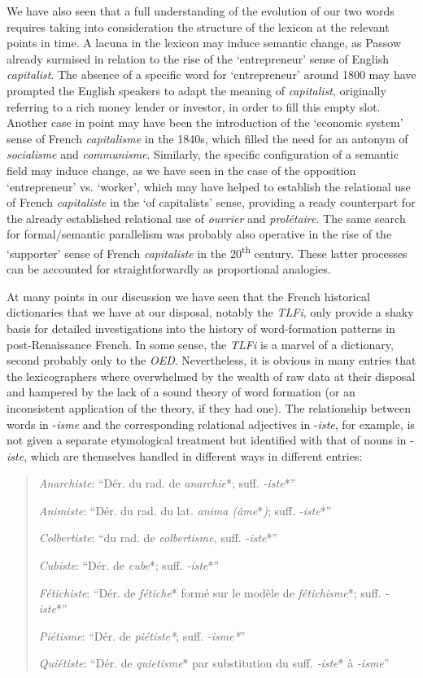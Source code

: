 \documentclass[output=paper]{langsci/langscibook}
\begin{document}
We have also seen that a full understanding of the evolution of our two
words requires taking into consideration the structure of the lexicon at
the relevant points in time. A lacuna in the lexicon may induce semantic
change, as Passow already surmised in relation to the rise of the
`entrepreneur' sense of English \emph{capitalist}. The absence of a
specific word for `entrepreneur' around 1800 may have prompted the
English speakers to adapt the meaning of \emph{capitalist},
originally referring to a rich money lender or investor, in order to
fill this empty slot. Another case in point may have been the
introduction of the `economic system' sense of French \emph{capitalisme}
in the 1840s, which filled the need for an antonym of \emph{socialisme}
and \emph{communisme}. Similarly, the specific configuration of a
semantic field may induce change, as we have seen in the case of the
opposition `entrepreneur' vs. `worker', which may have helped
to establish the relational use of French \emph{capitaliste} in the `of
capitalists' sense, providing a ready counterpart for the already
established relational use of \emph{ouvrier} and \emph{prolétaire}. The
same search for formal/semantic parallelism was probably also operative
in the rise of the `supporter' sense of French \emph{capitaliste} in the
20\textsuperscript{th} century. These latter processes can be accounted
for straightforwardly as proportional analogies.

At many points in our discussion we have seen that the French historical
dictionaries that we have at our disposal, notably the \emph{TLFi}, only
provide a shaky basis for detailed investigations into the history of
word-formation patterns in post-Renaissance French. In some sense, the
\emph{TLFi} is a marvel of a dictionary, second probably only to the \emph{OED}. Nevertheless, it is obvious in many entries that
the lexicographers where overwhelmed by the wealth of raw data at their
disposal and hampered by the lack of a sound theory of word formation
(or an inconsistent application of the theory, if they had one). The
relationship between words in -\emph{isme} and the corresponding
relational adjectives in -\emph{iste}, for example, is not given a
separate etymological treatment but identified with that of nouns in
-\emph{iste}, which are themselves handled in different ways in
different entries:

\begin{quote}
\emph{Anarchiste}: ``Dér. du rad. de \emph{anarchie}*; suff.
\emph{-iste}*''

\emph{Animiste}: ``Dér. du rad. du lat. \emph{anima (âme}*\emph{)};
suff. \emph{-iste}*''

\emph{Colbertiste}: ``du rad. de \emph{colbertisme,} suff.
\emph{-iste}*''

\emph{Cubiste}: ``Dér. de \emph{cube}*; suff. \emph{-iste}*''

\emph{Fétichiste}: ``Dér. de \emph{fétiche}* formé sur le modèle de
\emph{fétichisme}*; suff. \emph{-iste}*''

\emph{Piétisme}: ``Dér. de \emph{piétiste*}; suff. \emph{-isme*}''

\emph{Quiétiste}: ``Dér. de \emph{quietisme}* par substitution du suff.
\emph{-iste}* à \emph{-isme}''
\end{quote}
\end{document}
